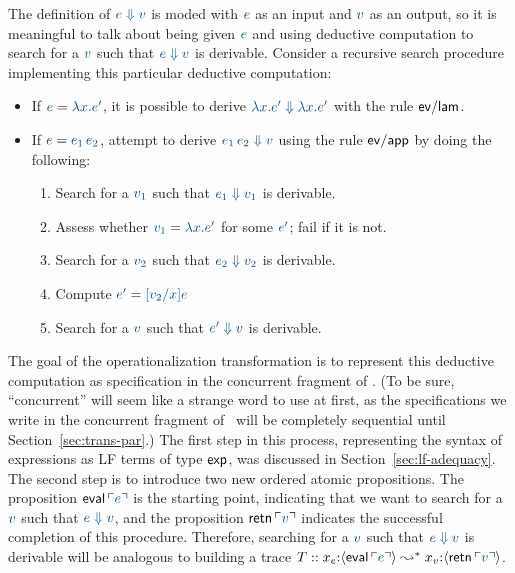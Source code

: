 The definition of $\obj{e \Downarrow v}$ is moded with $\obj{e}$ as an
input and $\obj{v}$ as an output, so it is meaningful to talk about
being given $\obj{e}$ and using deductive computation to search for a
$\obj{v}$ such that $\obj{e \Downarrow v}$ is derivable.  Consider a
recursive search procedure implementing this particular deductive
computation: 
\smallskip
\begin{itemize}
\item
      If $\obj{e} = \obj{\lambda x. e'}$, 
      it is possible to derive 
      $\obj{\lambda x. e' \Downarrow \lambda x. e'}$
      with the rule ${\sf ev/lam}$.
\item
       If $\obj{e} = \obj{e_1\,e_2}$,
       attempt to derive 
       $\obj{e_1\,e_2 \Downarrow v}$
       using the rule ${\sf ev/app}$ by doing the following:
    \begin{enumerate}
    \item Search for a $\obj{v_1}$ such that 
          $\obj{e_1 \Downarrow v_1}$ is derivable.
    \item Assess whether $\obj{v_1} = \obj{\lambda x.e'}$ for some
          $\obj{e'}$; fail if it is not.
    \item Search for a $\obj{v_2}$ such that 
          $\obj{e_2 \Downarrow v_2}$ is derivable.
    \item Compute $\obj{e'} = \obj{[v_2/x]e}$
    \item Search for a $\obj{v}$ such that 
          $\obj{e' \Downarrow v}$ is derivable.
    \end{enumerate}
\end{itemize}
\smallskip
%
The goal of the operationalization transformation is to represent this
deductive computation as specification in the concurrent fragment of
\sls. (To be sure, ``concurrent'' will seem 
like a strange word to use at first, as
the specifications we write in the concurrent fragment of \sls~will 
be completely sequential until Section~\ref{sec:trans-par}.)
The first step in this process, representing the syntax
of expressions as LF terms of type ${\sf exp}$, was discussed
in Section~\ref{sec:lf-adequacy}. The second step is to
introduce two new ordered atomic propositions.  The proposition ${\sf
  eval}\,\interp{e}$ is the starting point, indicating that we want to
search for a $\obj{v}$ such that $\obj{e \Downarrow v}$,
 and the proposition ${\sf
  retn}\,\interp{v}$ indicates the successful completion of this
procedure. Therefore, searching for a $\obj{v}$ such that 
$\obj{e \Downarrow v}$
is derivable will be analogous to building a trace $T ::
x_e{:}\susp{{\sf eval}\,\interp{e}} \leadsto^* x_v{:}\susp{{\sf
    retn}\,\interp{v}}$.

